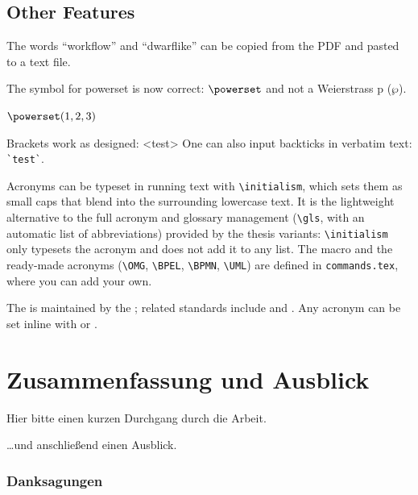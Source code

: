 \subsection{Other Features}

\begin{ltgexample}
The words \enquote{workflow} and \enquote{dwarflike} can be copied from the PDF and pasted to a text file.
\end{ltgexample}

\begin{ltgexample}
The symbol for powerset is now correct: $\powerset$ and not a Weierstrass p ($\wp$).

$\powerset({1,2,3})$
\end{ltgexample}

\begin{ltgexample}
Brackets work as designed:
<test>
One can also input backticks in verbatim text: \verb|`test`|.
\end{ltgexample}

Acronyms can be typeset in running text with \verb+\initialism+, which sets them as small caps that blend into the surrounding lowercase text. It is the lightweight alternative to the full acronym and glossary management (\verb+\gls+, with an automatic list of abbreviations) provided by the thesis variants: \verb+\initialism+ only typesets the acronym and does not add it to any list. The macro and the ready-made acronyms (\verb+\OMG+, \verb+\BPEL+, \verb+\BPMN+, \verb+\UML+) are defined in \texttt{commands.tex}, where you can add your own.

\begin{ltgexample}
The \UML is maintained by the \OMG; related standards include \BPEL and \BPMN.
Any acronym can be set inline with  or .
\end{ltgexample}


\section{Zusammenfassung und Ausblick}
\label{sec:outlook}
Hier bitte einen kurzen Durchgang durch die Arbeit.

\lipsum[1-2]

\ldots und anschließend einen Ausblick.

\subsubsection*{Danksagungen}

